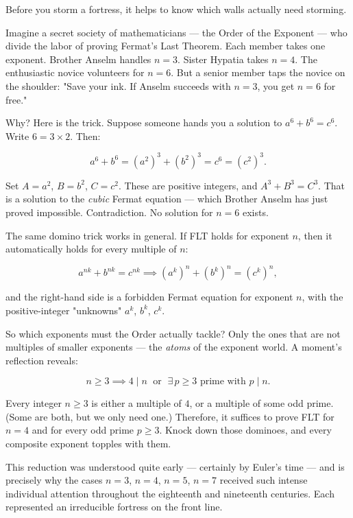 

Before you storm a fortress, it helps to know which walls actually need storming.

Imagine a secret society of mathematicians --- the Order of the Exponent --- who divide the labor of proving Fermat's Last Theorem. Each member takes one exponent. Brother Anselm handles $n = 3$. Sister Hypatia takes $n = 4$. The enthusiastic novice volunteers for $n = 6$. But a senior member taps the novice on the shoulder: "Save your ink. If Anselm succeeds with $n = 3$, you get $n = 6$ for free."

Why? Here is the trick. Suppose someone hands you a solution to $a^6 + b^6 = c^6$. Write $6 = 3 \times 2$. Then:

\[a^6 + b^6 = (a^2)^3 + (b^2)^3 = c^6 = (c^2)^3.\]

Set $A = a^2$, $B = b^2$, $C = c^2$. These are positive integers, and $A^3 + B^3 = C^3$. That is a solution to the \textit{cubic} Fermat equation --- which Brother Anselm has just proved impossible. Contradiction. No solution for $n = 6$ exists.

The same domino trick works in general. If FLT holds for exponent $n$, then it automatically holds for every multiple of $n$:

\[a^{nk} + b^{nk} = c^{nk} \implies (a^k)^n + (b^k)^n = (c^k)^n,\]

and the right-hand side is a forbidden Fermat equation for exponent $n$, with the positive-integer "unknowns" $a^k$, $b^k$, $c^k$.

So which exponents must the Order actually tackle? Only the ones that are not multiples of smaller exponents --- the \textit{atoms} of the exponent world. A moment's reflection reveals:

\[n \ge 3 \implies 4 \mid n \;\text{ or }\; \exists\, p \ge 3 \text{ prime with } p \mid n.\]

Every integer $n \ge 3$ is either a multiple of $4$, or a multiple of some odd prime. (Some are both, but we only need one.) Therefore, it suffices to prove FLT for $n = 4$ and for every odd prime $p \ge 3$. Knock down those dominoes, and every composite exponent topples with them.


This reduction was understood quite early --- certainly by Euler's time --- and is precisely why the cases $n = 3$, $n = 4$, $n = 5$, $n = 7$ received such intense individual attention throughout the eighteenth and nineteenth centuries. Each represented an irreducible fortress on the front line.


